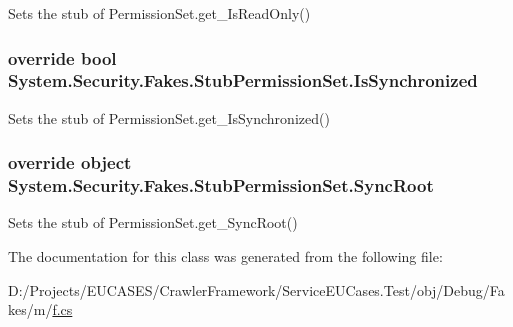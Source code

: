 Sets the stub of Permission\-Set.\-get\-\_\-\-Is\-Read\-Only()

\hypertarget{class_system_1_1_security_1_1_fakes_1_1_stub_permission_set_a681934d26296a312c63637d656f25022}{
\subsubsection[{Is\-Synchronized}]{\setlength{\rightskip}{0pt plus 5cm}override bool System.\-Security.\-Fakes.\-Stub\-Permission\-Set.\-Is\-Synchronized\hspace{0.3cm}{\ttfamily [get]}}}\label{class_system_1_1_security_1_1_fakes_1_1_stub_permission_set_a681934d26296a312c63637d656f25022}


Sets the stub of Permission\-Set.\-get\-\_\-\-Is\-Synchronized()

\hypertarget{class_system_1_1_security_1_1_fakes_1_1_stub_permission_set_a45b2da1665732a2217d124e8d0983b85}{
\subsubsection[{Sync\-Root}]{\setlength{\rightskip}{0pt plus 5cm}override object System.\-Security.\-Fakes.\-Stub\-Permission\-Set.\-Sync\-Root\hspace{0.3cm}{\ttfamily [get]}}}\label{class_system_1_1_security_1_1_fakes_1_1_stub_permission_set_a45b2da1665732a2217d124e8d0983b85}


Sets the stub of Permission\-Set.\-get\-\_\-\-Sync\-Root()



The documentation for this class was generated from the following file\-:\begin{DoxyCompactItemize}
\item 
D\-:/\-Projects/\-E\-U\-C\-A\-S\-E\-S/\-Crawler\-Framework/\-Service\-E\-U\-Cases.\-Test/obj/\-Debug/\-Fakes/m/\hyperlink{m_2f_8cs}{f.\-cs}\end{DoxyCompactItemize}
